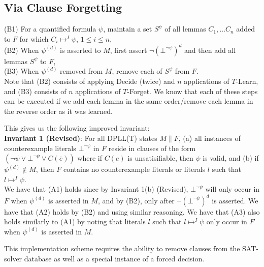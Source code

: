 \documentclass{llncs}
\begin{document}
\subsection{Via Clause Forgetting}

\noindent (B1) For a quantified formula $\psi$, maintain a set $S^\psi$ of all lemmas $C_1, \ldots C_n$ added to $F$ for which $C_i \mapsto^I \psi$, $1 \leq i \leq n$, \\
(B2) When $\psi^{(d)}$ is asserted to $M$, first assert $\neg (\bot^{\neg \psi})^d$ and then add all lemmas $S^\psi$ to $F$, \\
(B3) When $\psi^{(d)}$ removed from $M$, remove each of $S^\psi$ from $F$. \\

Note that (B2) consists of applying Decide (twice) and $n$ applications of $T$-Learn, and (B3) consists of $n$ applications of $T$-Forget.
We know that each of these steps can be executed if we add each lemma in the same order/remove each lemma in the reverse order as it was learned.

This gives us the following improved invariant: \\

{\bf Invariant 1 (Revised)}:
For all DPLL(T) states $M \parallel F$,
(a) all instances of counterexample literals $\bot^{\neg \psi}$ in $F$ reside in clauses of the form $( \neg \psi \vee \bot^{\neg \psi} \vee C(\bar{e}) )$ where if $C(e)$ is unsatisifiable, then $\psi$ is valid, and
(b) if $\psi^{(d)} \not\in M$, then $F$ contains no counterexample literals or literals $l$ such that $l \mapsto^I \psi$. \\

We have that (A1) holds since by Invariant 1(b) (Revised), $\bot^{\neg \psi}$ will only occur in $F$ when $\psi^{(d)}$ is asserted in $M$, and by (B2), only after $\neg (\bot^{\neg \psi})^d$ is asserted.
We have that (A2) holds by (B2) and using similar reasoning.
We have that (A3) also holds similarly to (A1) by noting that literals $l$ such that $l \mapsto^I \psi$ only occur in $F$ when $\psi^{(d)}$ is asserted in $M$.

This implementation scheme requires the ability to remove clauses from the SAT-solver database as well as a special instance of a forced decision.

\begin{comment}
\subsection{Via Controlling Decisions}

\noindent (C1) For a quantified formula $\psi$, maintain a set $L^\psi$ of literals $l_1, \ldots l_n, \bot^{\neg \psi} \in F$ such that $l_i \mapsto^I \psi$, $1 \leq i \leq n$, \\
(C2) When $\psi \not\in M$, mark literals, \\
(C3)
(C4) When $\psi^{(d)}$ is asserted to $M$, assert $\neg (\bot^{\neg \psi})^d$, \\
\end{comment}
\end{document}
